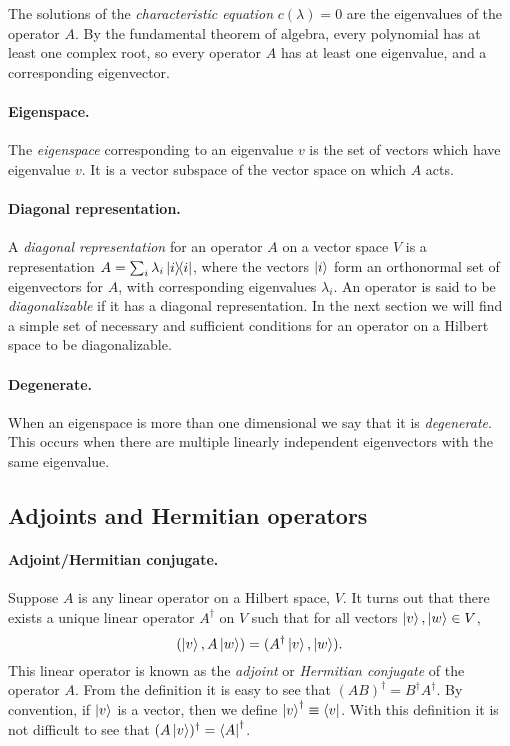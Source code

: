 \documentclass{article}
\begin{document}
The solutions of the \emph{characteristic equation} $c(\lambda) = 0$ are the
eigenvalues of the operator $A$. By the fundamental theorem of algebra, every
polynomial has at least one complex root, so every operator $A$ has at least
one eigenvalue, and a corresponding eigenvector.

\paragraph{Eigenspace.} The \emph{eigenspace} corresponding to an eigenvalue
$v$ is the set of vectors which have eigenvalue $v$. It is a vector subspace of
the vector space on which $A$ acts.

\paragraph{Diagonal representation.} A \emph{diagonal representation} for an
operator $A$ on a vector space $V$ is a representation $A = \sum_i \lambda_i
\ketbra{i}{i}$, where the vectors $\ket{i}$ form an orthonormal set of
eigenvectors for $A$, with corresponding eigenvalues $\lambda_i$. An operator
is said to be \emph{diagonalizable} if it has a diagonal representation. In the
next section we will find a simple set of necessary and sufficient conditions
for an operator on a Hilbert space to be diagonalizable.

\paragraph{Degenerate.} When an eigenspace is more than one dimensional we say
that it is \emph{degenerate}. This occurs when there are multiple linearly
independent eigenvectors with the same eigenvalue.

\subsection{Adjoints and Hermitian operators}

\paragraph{Adjoint/Hermitian conjugate.} Suppose $A$ is any linear operator on
a Hilbert space, $V$. It turns out that there exists a unique linear operator
$A^\dagger$ on $V$ such that for all vectors $\ket{v}, \ket{w} \in V$,
\begin{equation}
  (\ket{v}, A\ket{w}) = (A^\dagger \ket{v}, \ket{w}). \label{eq:adj}
\end{equation}
This linear operator is known as the \emph{adjoint} or \emph{Hermitian
conjugate} of the operator $A$. From the definition it is easy to see that
$(AB)^\dagger = B^\dagger A^\dagger$. By convention, if $\ket{v}$ is a vector,
then we define $\ket{v}^\dagger \equiv \bra{v}$. With this definition it is not
difficult to see that $(A\ket{v})^\dagger = \bra A^\dagger$.
\end{document}
